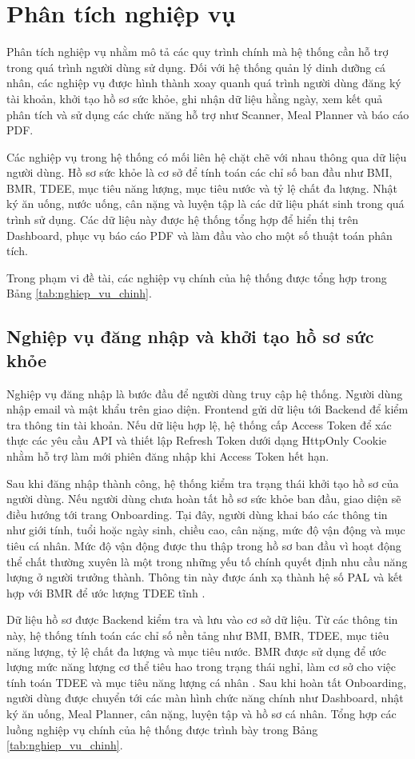 \documentclass[12pt, a4paper]{report}
\begin{document}
\section{Phân tích nghiệp vụ}Phân tích nghiệp vụ nhằm mô tả các quy trình chính mà hệ thống cần hỗ trợ trong quá trình người dùng sử dụng. Đối với hệ thống quản lý dinh dưỡng cá nhân, các nghiệp vụ được hình thành xoay quanh quá trình người dùng đăng ký tài khoản, khởi tạo hồ sơ sức khỏe, ghi nhận dữ liệu hằng ngày, xem kết quả phân tích và sử dụng các chức năng hỗ trợ như Scanner, Meal Planner và báo cáo PDF.

Các nghiệp vụ trong hệ thống có mối liên hệ chặt chẽ với nhau thông qua dữ liệu người dùng. Hồ sơ sức khỏe là cơ sở để tính toán các chỉ số ban đầu như BMI, BMR, TDEE, mục tiêu năng lượng, mục tiêu nước và tỷ lệ chất đa lượng. Nhật ký ăn uống, nước uống, cân nặng và luyện tập là các dữ liệu phát sinh trong quá trình sử dụng. Các dữ liệu này được hệ thống tổng hợp để hiển thị trên Dashboard, phục vụ báo cáo PDF và làm đầu vào cho một số thuật toán phân tích.

Trong phạm vi đề tài, các nghiệp vụ chính của hệ thống được tổng hợp trong Bảng \ref{tab:nghiep_vu_chinh}.

\subsection{Nghiệp vụ đăng nhập và khởi tạo hồ sơ sức khỏe}Nghiệp vụ đăng nhập là bước đầu để người dùng truy cập hệ thống. Người dùng nhập email và mật khẩu trên giao diện. Frontend gửi dữ liệu tới Backend để kiểm tra thông tin tài khoản. Nếu dữ liệu hợp lệ, hệ thống cấp Access Token để xác thực các yêu cầu API và thiết lập Refresh Token dưới dạng HttpOnly Cookie nhằm hỗ trợ làm mới phiên đăng nhập khi Access Token hết hạn.

Sau khi đăng nhập thành công, hệ thống kiểm tra trạng thái khởi tạo hồ sơ của người dùng. Nếu người dùng chưa hoàn tất hồ sơ sức khỏe ban đầu, giao diện sẽ điều hướng tới trang Onboarding. Tại đây, người dùng khai báo các thông tin như giới tính, tuổi hoặc ngày sinh, chiều cao, cân nặng, mức độ vận động và mục tiêu cá nhân. Mức độ vận động được thu thập trong hồ sơ ban đầu vì hoạt động thể chất thường xuyên là một trong những yếu tố chính quyết định nhu cầu năng lượng ở người trưởng thành. Thông tin này được ánh xạ thành hệ số PAL và kết hợp với BMR để ước lượng TDEE tĩnh \cite{fao_who_unu_2001}.

Dữ liệu hồ sơ được Backend kiểm tra và lưu vào cơ sở dữ liệu. Từ các thông tin này, hệ thống tính toán các chỉ số nền tảng như BMI, BMR, TDEE, mục tiêu năng lượng, tỷ lệ chất đa lượng và mục tiêu nước. BMR được sử dụng để ước lượng mức năng lượng cơ thể tiêu hao trong trạng thái nghỉ, làm cơ sở cho việc tính toán TDEE và mục tiêu năng lượng cá nhân \cite{mifflin1990}. Sau khi hoàn tất Onboarding, người dùng được chuyển tới các màn hình chức năng chính như Dashboard, nhật ký ăn uống, Meal Planner, cân nặng, luyện tập và hồ sơ cá nhân. Tổng hợp các luồng nghiệp vụ chính của hệ thống được trình bày trong Bảng \ref{tab:nghiep_vu_chinh}.
\end{document}
